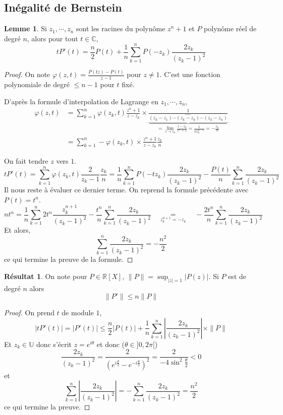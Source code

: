 \documentclass{article}
\theoremstyle{definition}
\newtheorem*{lmm}{Lemme}
\newtheorem*{res}{Résultat}
\begin{document}
\subsection{Inégalité de Bernstein}

\begin{lmm}
Si $z_1, \cdots, z_n$ sont les racines du polynôme $z^n+1$ et $P$ polynôme réel de degré $n$, alors pour tout $t\in\mathbb C$, \[
    tP'(t)=\frac n2P(t)+\frac 1n\sum_{k=1}^nP(-z_k)\frac{2z_k}{(z_k-1)^2}
\]
\end{lmm}

\begin{proof}
On note $\varphi(z, t)=\frac{P(tz)-P(t)}{z-1}$ pour $z\neq 1$. C'est une fonction polynomiale de degré $\leq n-1$ pour $t$ fixé.

D'après la formule d'interpolation de Lagrange en $z_1, \cdots, z_n$, \begin{align*}
    \varphi(z, t)&=\sum_{k=1}^n\varphi(z_k, t)\frac{z^n+1}{z-z_k} \times \underbrace{\frac1{(z_k-z_1)\cdots \widehat{(z_k-z_k)}\cdots (z_k-z_n)}}_{=\lim_{z\to z_k}\limits \frac{z-z_k}{z^n+1}=\frac1{nz_k^{n-1}}=-\frac{z_k}n} \\ &= \sum_{k=1}^n-\varphi(z_k, t)\times \frac{z^n+1}{z-z_k}\frac{z_k}n
\end{align*}

On fait tendre $z$ vers $1$. \[
    tP'(t)=\sum_{k=1}^n\varphi(z_k, t)\frac{2}{z_k-1}\frac{z_k}n=
    \frac1n\sum_{k=1}^nP(-tz_k)\frac{2z_k}{(z_k-1)^2}-\frac{P(t)}{n}\sum_{k=1}^n\frac{2z_k}{(z_k-1)^2}
\]
Il nous reste à évaluer ce dernier terme. On reprend la formule précédente avec $P(t)=t^n$. \[
    nt^n=\frac1n\sum_{k=1}^n2t^n\frac{z_k^{n+1}}{(z_k-1)^2}-\frac{t^n}{n}\sum_{k=1}^n\frac{2z_k}{(z_k-1)^2}\quad \underset{z_k^{n+1}=-z_k}{=}\quad -\frac{2t^n}n\sum_{k=1}^n\frac{2z_k}{(z_k-1)^2}
\]
Et alors,
\[
\sum_{k=1}^n\frac{2z_k}{(z_k-1)^2}=-\frac{n^2}2
\]
ce qui termine la preuve de la formule.
\end{proof}

\begin{res}
On note pour $P\in\mathbb R[X]$, $\|P\|=\sup_{|z|=1}\limits|P(z)|$. Si $P$ est de degré $n$ alors \[
    \|P'\|\leq n\|P\|
\]
\end{res}

\begin{proof}
On prend $t$ de module $1$, \[
    |tP'(t)|=|P'(t)|\leq \frac n2|P(t)|+\frac1n\sum_{k=1}^n\left|\frac{2z_k}{(z_k-1)^2}\right|\times \|P\|
\]
Et $z_k\in\mathbb U$ donc s'écrit $z=e^{i\theta}$ et donc ($\theta\in ]0, 2\pi[$) \[
    \frac{2z_k}{(z_k-1)^2}=\frac{2}{(e^{i\frac \theta 2}-e^{-i\frac \theta2})^2}=\frac 2{-4\sin^2\frac\theta 2}<0
\]
et \[
    \sum_{k=1}^n\left|\frac{2z_k}{(z_k-1)^2}\right|=-\sum_{k=1}^n\frac{2z_k}{(z_k-1)^2}=\frac{n^2}2
\]
ce qui termine la preuve.
\end{proof}
\end{document}

